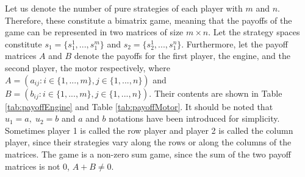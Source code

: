 Let us denote the number of pure strategies of each player with $m$ and $n$. Therefore, these constitute a bimatrix game, meaning that the payoffs of the game can be represented in two matrices of size $m \times n$. Let the strategy spaces constitute $s_1 = \{s_1^1,...,s_1^m\}$ and $s_2 = \{s_2^1,...,s_1^n\}$. Furthermore, let the payoff matrices $A$ and $B$ denote the payoffs for the first player, the engine, and the second player, the motor respectively, where $A = (a_{ij}: i \in \{1,...,m\}, j \in \{ 1,...,n\})$ and $B = (b_{ij}: i \in \{1,...,m\}, j \in \{ 1,...,n\})$.  Their contents are shown in Table \ref{tab:payoffEngine} and Table \ref{tab:payoffMotor}. It should be noted that $u_1 = a, \; u_2 = b$ and $a$ and $b$ notations have been introduced for simplicity. Sometimes player 1 is called the row player and player 2 is called the column player, since their strategies vary along the rows or along the columns of the matrices. The game is a non-zero sum game, since the sum of the two payoff matrices is not 0, $A + B \neq 0$.

